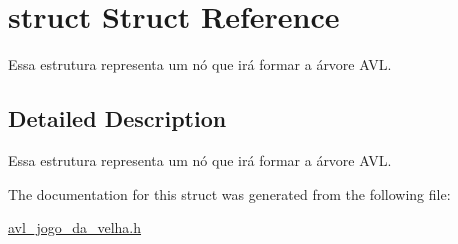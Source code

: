 \hypertarget{structstruct}{}\section{struct Struct Reference}
\label{structstruct}


Essa estrutura representa um nó que irá formar a árvore A\+VL.  




\subsection{Detailed Description}
Essa estrutura representa um nó que irá formar a árvore A\+VL. 

The documentation for this struct was generated from the following file\+:\begin{DoxyCompactItemize}
\item 
\hyperlink{avl__jogo__da__velha_8h}{avl\+\_\+jogo\+\_\+da\+\_\+velha.\+h}\end{DoxyCompactItemize}
